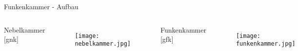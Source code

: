 
\begin{frame}{Funkenkammer - Aufbau}
    \begin{columns}[T]
	    Nebelkammer [gnk]
			\begin{figure}[htbp]
			  \centering
			  \texttt{[image: nebelkammer.jpg]}
			\end{figure}
			
	    Funkenkammer [gfk]
	    	\begin{figure}[htbp]
			  \centering
			  \texttt{[image: funkenkammer.jpg]}
			\end{figure}
    \end{columns}
\end{frame}

% 
% 
%     
% 			  
% 			

